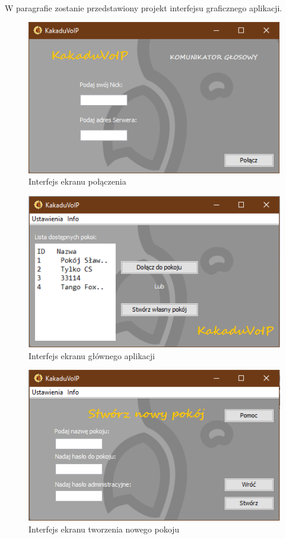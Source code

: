 \documentclass{article}
\begin{document}
	\paragraph*{} W paragrafie zostanie przedstawiony projekt interfejsu graficznego aplikacji.
	\begin{figure}[H]
		\centering
		\hspace*{0cm} 
		\includegraphics[scale=0.9]{1_1.png}
		\caption[]{Interfejs ekranu połączenia}
		\label{fig:gui1}
	\end{figure}
	\begin{figure}[H]
		\centering
		\includegraphics[scale=0.9]{1_2.png}
		\caption[]{Interfejs ekranu głównego aplikacji}
		\label{fig:gui2}
	\end{figure}
	\begin{figure}[H]
		\centering
		\includegraphics[scale=0.9]{1_3.png}
		\caption[]{Interfejs ekranu tworzenia nowego pokoju}
		\label{fig:gui3}
	\end{figure}
\end{document}
